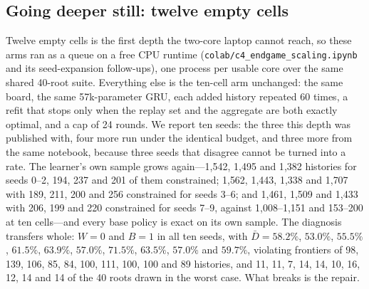\documentclass[conference]{IEEEtran}
\begin{document}
\subsection{Going deeper still: twelve empty cells}
\label{sec:twelve}
Twelve empty cells is the first depth the two-core laptop cannot reach, so these arms ran as a queue on a free CPU runtime (\texttt{colab/c4\_endgame\_scaling.ipynb} and its seed-expansion follow-ups), one process per usable core over the same shared 40-root suite. Everything else is the ten-cell arm unchanged: the same board, the same 57k-parameter GRU, each added history repeated 60 times, a refit that stops only when the replay set and the aggregate are both exactly optimal, and a cap of 24 rounds. We report ten seeds: the three this depth was published with, four more run under the identical budget, and three more from the same notebook, because three seeds that disagree cannot be turned into a rate. The learner's own sample grows again---1{,}542, 1{,}495 and 1{,}382 histories for seeds 0--2, 194, 237 and 201 of them constrained; 1{,}562, 1{,}443, 1{,}338 and 1{,}707 with 189, 211, 200 and 256 constrained for seeds 3--6; and 1{,}461, 1{,}509 and 1{,}433 with 206, 199 and 220 constrained for seeds 7--9, against 1{,}008--1{,}151 and 153--200 at ten cells---and every base policy is exact on its own sample. The diagnosis transfers whole: $W=0$ and $B=1$ in all ten seeds, with $\bar D=58.2\%$, $53.0\%$, $55.5\%$, $61.5\%$, $63.9\%$, $57.0\%$, $71.5\%$, $63.5\%$, $57.0\%$ and $59.7\%$, violating frontiers of 98, 139, 106, 85, 84, 100, 111, 100, 100 and 89 histories, and 11, 11, 7, 14, 14, 10, 16, 12, 14 and 14 of the 40 roots drawn in the worst case. What breaks is the repair.
\end{document}
